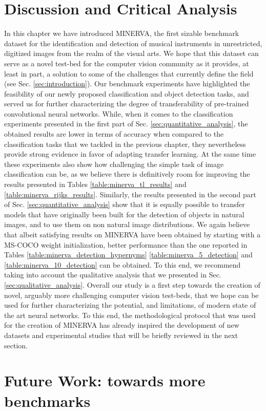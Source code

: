 \section{Discussion and Critical Analysis}
\label{sec:discussion}
In this chapter we have introduced MINERVA, the first sizable benchmark dataset for the identification and detection of musical instruments in unrestricted, digitized images from the realm of the visual arts. We hope that this dataset can serve as a novel test-bed for the computer vision community as it provides, at least in part, a solution to some of the challenges that currently define the field (see Sec. \ref{sec:introduction}). Our benchmark experiments have highlighted the feasibility of our newly proposed classification and object detection tasks, and served us for further characterizing the degree of transferability of pre-trained convolutional neural networks. While, when it comes to the classification experiments presented in the first part of Sec. \ref{sec:quantitative_analysis}, the obtained results are lower in terms of accuracy when compared to the classification tasks that we tackled in the previous chapter, they nevertheless provide strong evidence in favor of adapting transfer learning. At the same time these experiments also show how challenging the simple task of image classification can be, as we believe there is definitively room for improving the results presented in Tables \ref{table:minerva_tl_results} and \ref{table:minerva_rijks_results}. Similarly, the results presented in the second part of Sec. \ref{sec:quantitative_analysis} show that it is equally possible to transfer models that have originally been built for the detection of objects in natural images, and to use them on non natural image distributions. We again believe that albeit satisfying results on MINERVA have been obtained by starting with a MS-COCO weight initialization, better performance than the one reported in Tables \ref{table:minerva_detection_hypernyms} \ref{table:minerva_5_detection} and \ref{table:minerva_10_detection} can be obtained. To this end, we recommend taking into account the qualitative analysis that we presented in Sec. \ref{sec:qualitative_analysis}. Overall our study is a first step towards the creation of novel, arguably more challenging computer vision test-beds, that we hope can be used for further characterizing the potential, and limitations, of modern state of the art neural networks. To this end, the methodological protocol that was used for the creation of MINERVA has already inspired the development of new datasets and experimental studies that will be briefly reviewed in the next section.

\section{Future Work: towards more benchmarks}
\label{sec:future_work}
